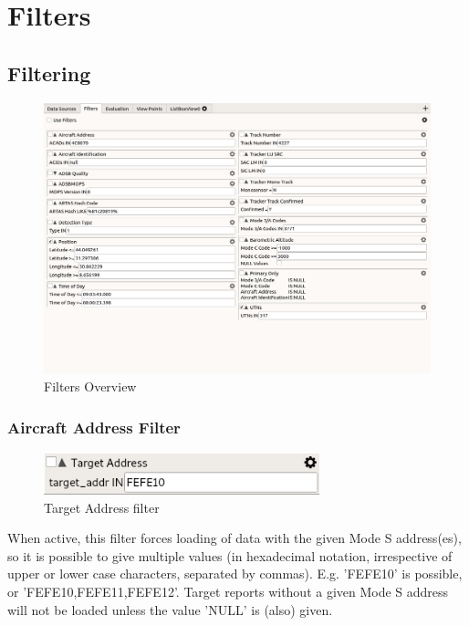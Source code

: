 
\chapter{Filters}
\label{sec:filters} 

\section{Filtering}
\label{sec:filtering}

\begin{figure}[H]
    \hspace*{-2.5cm}
    \includegraphics[width=19cm,frame]{figures/ui_filters.png}
  \caption{Filters Overview}
\end{figure}

\subsection{Aircraft Address Filter}

\begin{figure}[H]
  \center
    \includegraphics[width=8cm,frame]{figures/filter_acad.png}
  \caption{Target Address filter}
\end{figure}

When active, this filter forces loading of data with the given Mode S address(es), so it is possible to give multiple values (in hexadecimal notation, irrespective of upper or lower case characters, separated by commas). E.g. 'FEFE10' is possible, or 'FEFE10,FEFE11,FEFE12'. Target reports without a given Mode S address will not be loaded unless the value 'NULL' is (also) given.

